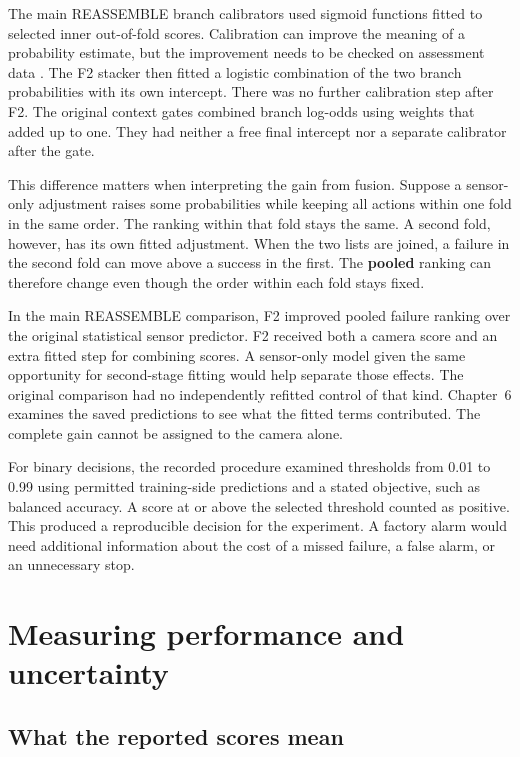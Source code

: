 The main REASSEMBLE branch calibrators used sigmoid functions fitted to selected inner
out-of-fold scores. Calibration can improve the meaning of a probability estimate, but
the improvement needs to be checked on assessment data \parencite{Guo2017Calibration}.
The F2 stacker then fitted a logistic combination of the two branch probabilities with
its own intercept. There was no further calibration step after F2. The original context
gates combined branch log-odds using weights that added up to one. They had neither a
free final intercept nor a separate calibrator after the gate.

This difference matters when interpreting the gain from fusion. Suppose a sensor-only
adjustment raises some probabilities while keeping all actions within one fold in the
same order. The ranking within that fold stays the same. A second fold, however, has its
own fitted adjustment. When the two lists are joined, a failure in the second fold can
move above a success in the first. The \textbf{pooled} ranking can therefore change even
though the order within each fold stays fixed.

In the main REASSEMBLE comparison, F2 improved pooled failure ranking over the original
statistical sensor predictor. F2 received both a camera score and an extra fitted step
for combining scores. A sensor-only model given the same opportunity for second-stage
fitting would help separate those effects. The original comparison had no independently
refitted control of that kind. Chapter~6 examines the saved predictions to see what the
fitted terms contributed. The complete gain cannot be assigned to the camera alone.

For binary decisions, the recorded procedure examined thresholds from 0.01 to 0.99 using
permitted training-side predictions and a stated objective, such as balanced accuracy. A
score at or above the selected threshold counted as positive. This produced a
reproducible decision for the experiment. A factory alarm would need additional
information about the cost of a missed failure, a false alarm, or an unnecessary stop.

\section{Measuring performance and uncertainty}
\label{sec:ch4-metrics}

\subsection{What the reported scores mean}


